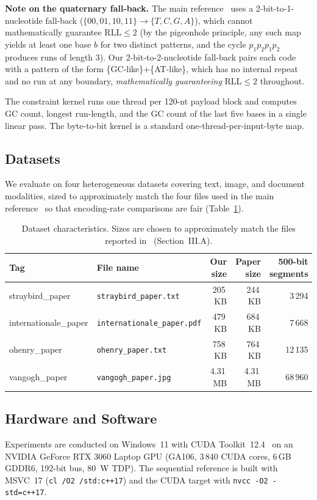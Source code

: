 \documentclass[runningheads]{llncs}
\begin{document}
\textbf{Note on the quaternary fall-back.}
The main reference~\cite{ref_rste} uses a 2-bit-to-1-nucleotide fall-back
($\{00,01,10,11\}\to\{T,C,G,A\}$), which cannot mathematically guarantee
RLL$\leq 2$ (by the pigeonhole principle, any such map yields at least
one base $b$ for two distinct patterns, and the cycle $p_1 p_2 p_1 p_2$
produces runs of length 3).  Our 2-bit-to-2-nucleotide fall-back pairs
each code with a pattern of the form \{GC-like\}+\{AT-like\}, which
has no internal repeat and no run at any boundary,
\emph{mathematically guaranteeing} RLL$\leq 2$ throughout.

The constraint kernel runs one thread per 120-nt payload block and
computes GC count, longest run-length, and the GC count of the last
five bases in a single linear pass.  The byte-to-bit kernel is a
standard one-thread-per-input-byte map.

\subsection{Datasets}
We evaluate on four heterogeneous datasets covering text, image, and
document modalities, sized to approximately match the four files used
in the main reference~\cite{ref_rste} so that encoding-rate
comparisons are fair (Table~\ref{tab:datasets}).

\begin{table}[t]
\caption{Dataset characteristics.  Sizes are chosen to approximately
match the files reported in~\cite{ref_rste} (Section~III.A).}
\label{tab:datasets}
\centering\small
\begin{tabular}{llrrr}
\toprule
Tag                 & File name                       & Our size  & Paper size & 500-bit segments \\
\midrule
straybird\_paper    & \texttt{straybird\_paper.txt}    & 205\,KB   & 244\,KB    & 3\,294 \\
internationale\_paper & \texttt{internationale\_paper.pdf} & 479\,KB & 684\,KB    & 7\,668 \\
ohenry\_paper       & \texttt{ohenry\_paper.txt}       & 758\,KB   & 764\,KB    & 12\,135 \\
vangogh\_paper      & \texttt{vangogh\_paper.jpg}      & 4.31\,MB  & 4.31\,MB   & 68\,960 \\
\bottomrule
\end{tabular}
\end{table}

\subsection{Hardware and Software}
Experiments are conducted on Windows~11 with CUDA Toolkit~12.4~\cite{ref_cudaguide} on an
NVIDIA GeForce RTX 3060 Laptop GPU (GA106, 3\,840 CUDA cores, 6\,GB
GDDR6, 192-bit bus, 80~W TDP).  The sequential reference is built with
MSVC~17 (\texttt{cl /O2 /std:c++17}) and the CUDA target with
\texttt{nvcc -O2 -std=c++17}.
\end{document}
